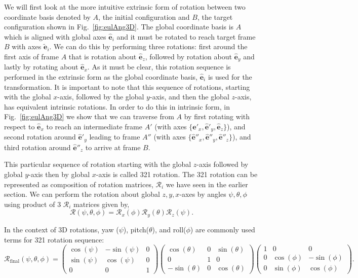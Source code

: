 \documentclass{article}
\def\eh{\hat{\mathbf{e}}}
\def\et{\tilde{\mathbf{e}}}
\def\R{\mathcal{R}}
\begin{document}
We will first look at the more intuitive extrinsic form of rotation between two coordinate basis denoted by $A$, the initial configuration and $B$, the target configuration shown in Fig.~\ref{fig:eulAng3D}. The global coordinate basis is $A$ which is aligned with global axes $\eh_i$ and it must be rotated to reach target frame $B$ with axes $\et_i$. We can do this by performing three rotations: first around the first axis of frame $A$ that is rotation about $\eh_z$, followed by rotation about $\eh_y$ and lastly by rotating about $\eh_x$. As it must be clear, this rotation sequence is performed in the extrinsic form as the global coordinate basis, $\eh_i$ is used for the transformation. It is important to note that this sequence of rotations, starting with the global $x$-axis, followed by the global $y$-axis, and then the global $z$-axis, has equivalent intrinsic rotations. In order to do this in intrinsic form, in Fig.~\ref{fig:eulAng3D} we show that we can traverse from $A$ by first rotating with respect to $\eh_x$ to reach an intermediate frame $A'$ (with axes $\{ \eh'_x, \eh'_y, \eh_z \}$), and second rotation around $\eh'_y$ leading to frame $A''$ (with axes $\{ \eh''_x, \eh''_y, \eh''_z \}$), and third rotation around $\eh''_z$ to arrive at frame $B$.

This particular sequence of rotation starting with the global $z$-axis followed by global $y$-axis then by global $x$-axis is called 321 rotation. The 321 rotation can be represented as composition of rotation matrices, $\R_i$ we have seen in the earlier section. We can perform the rotation about global $z, y, x$-axes by angles $\psi, \theta, \phi$ using product of 3 $\R_i$ matrices given by,
\[
  \R (\psi, \theta, \phi) = \R_x(\phi) \R_y(\theta) \R_z(\psi).
\]

\noindent In the context of 3D rotations, yaw (\( \psi \)), pitch(\( \theta \)), and roll(\( \phi \)) are commonly used terms for 321 rotation sequence:
\[
  \R_{\text{final}} (\psi, \theta, \phi) = 
\begin{pmatrix} 
    \cos(\psi) & -\sin(\psi) & 0 \\
    \sin(\psi) & \cos(\psi) & 0 \\
    0 & 0 & 1 
\end{pmatrix}
\begin{pmatrix}
\cos(\theta) & 0 & \sin(\theta) \\
0 & 1 & 0 \\
-\sin(\theta) & 0 & \cos(\theta)
\end{pmatrix}
\begin{pmatrix} 
    1 & 0 & 0 \\
    0 & \cos(\phi) & -\sin(\phi) \\
    0 & \sin(\phi) & \cos(\phi)
\end{pmatrix}.
\]
\end{document}

